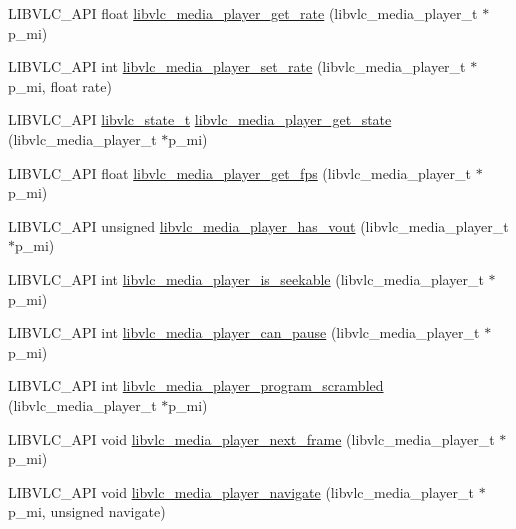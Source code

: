 \begin{DoxyCompactItemize}
\item 
L\+I\+B\+V\+L\+C\+\_\+\+A\+PI float \hyperlink{group__libvlc__media__player_ga1ae5393783c03bd23a6b0c198aacf3cd}{libvlc\+\_\+media\+\_\+player\+\_\+get\+\_\+rate} (libvlc\+\_\+media\+\_\+player\+\_\+t $\ast$p\+\_\+mi)
\item 
L\+I\+B\+V\+L\+C\+\_\+\+A\+PI int \hyperlink{group__libvlc__media__player_gaa81be3afb20eddedf7ae56e98d4b1e06}{libvlc\+\_\+media\+\_\+player\+\_\+set\+\_\+rate} (libvlc\+\_\+media\+\_\+player\+\_\+t $\ast$p\+\_\+mi, float rate)
\item 
L\+I\+B\+V\+L\+C\+\_\+\+A\+PI \hyperlink{group__libvlc__media_gac88ad60037ea05e1f23675a2ebe31efc}{libvlc\+\_\+state\+\_\+t} \hyperlink{group__libvlc__media__player_gac6537a6b1387db3a96b48947b0aa8b87}{libvlc\+\_\+media\+\_\+player\+\_\+get\+\_\+state} (libvlc\+\_\+media\+\_\+player\+\_\+t $\ast$p\+\_\+mi)
\item 
L\+I\+B\+V\+L\+C\+\_\+\+A\+PI float \hyperlink{group__libvlc__media__player_ga96f0bc4a9d11c1880c40ec152fad3c0c}{libvlc\+\_\+media\+\_\+player\+\_\+get\+\_\+fps} (libvlc\+\_\+media\+\_\+player\+\_\+t $\ast$p\+\_\+mi)
\item 
L\+I\+B\+V\+L\+C\+\_\+\+A\+PI unsigned \hyperlink{group__libvlc__media__player_ga2458b35abe7063cdfe5e6ef87a3be3b6}{libvlc\+\_\+media\+\_\+player\+\_\+has\+\_\+vout} (libvlc\+\_\+media\+\_\+player\+\_\+t $\ast$p\+\_\+mi)
\item 
L\+I\+B\+V\+L\+C\+\_\+\+A\+PI int \hyperlink{group__libvlc__media__player_gaf39dbbcb37cd5bcc3cdf203de8e117e3}{libvlc\+\_\+media\+\_\+player\+\_\+is\+\_\+seekable} (libvlc\+\_\+media\+\_\+player\+\_\+t $\ast$p\+\_\+mi)
\item 
L\+I\+B\+V\+L\+C\+\_\+\+A\+PI int \hyperlink{group__libvlc__media__player_ga764022fed72e41c7cb2988a93834ec5c}{libvlc\+\_\+media\+\_\+player\+\_\+can\+\_\+pause} (libvlc\+\_\+media\+\_\+player\+\_\+t $\ast$p\+\_\+mi)
\item 
L\+I\+B\+V\+L\+C\+\_\+\+A\+PI int \hyperlink{group__libvlc__media__player_gadce5576edbd7817b130cbeeea9973e86}{libvlc\+\_\+media\+\_\+player\+\_\+program\+\_\+scrambled} (libvlc\+\_\+media\+\_\+player\+\_\+t $\ast$p\+\_\+mi)
\item 
L\+I\+B\+V\+L\+C\+\_\+\+A\+PI void \hyperlink{group__libvlc__media__player_gadbfec72aef61dd499c7a5c06271911bc}{libvlc\+\_\+media\+\_\+player\+\_\+next\+\_\+frame} (libvlc\+\_\+media\+\_\+player\+\_\+t $\ast$p\+\_\+mi)
\item 
L\+I\+B\+V\+L\+C\+\_\+\+A\+PI void \hyperlink{group__libvlc__media__player_ga8fe3bb8a48af33a012040196b0953a93}{libvlc\+\_\+media\+\_\+player\+\_\+navigate} (libvlc\+\_\+media\+\_\+player\+\_\+t $\ast$p\+\_\+mi, unsigned navigate)

\end{DoxyCompactItemize}
